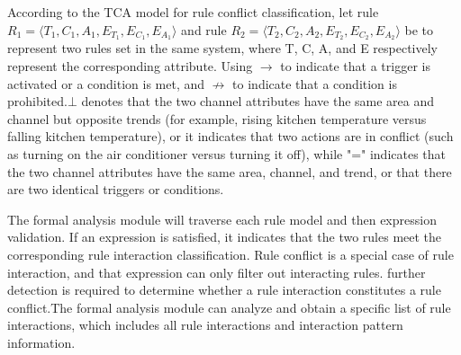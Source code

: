 According to the TCA model for rule conflict classification, let rule $R_1=\langle T_1,C_1,A_1,E_{T_1},E_{C_1},E_{A_1} \rangle$ and rule  $R_2=\langle T_2,C_2,A_2,E_{T_2},E_{C_2},E_{A_2} \rangle$ be to represent two rules set in the same system, where T, C, A, and E respectively represent the corresponding attribute. Using $\rightarrow$ to indicate that a trigger is activated or a condition is met, and $\nrightarrow$ to indicate that a condition is prohibited.$\bot$ denotes that the two channel attributes have the same area and channel but opposite trends (for example, rising kitchen temperature versus falling kitchen temperature), or it indicates that two actions are in conflict (such as turning on the air conditioner versus turning it off), while "=" indicates that the two channel attributes have the same area, channel, and trend, or that there are two identical triggers or conditions.

The formal analysis module will traverse each rule model and then expression validation. If an expression is satisfied, it indicates that the two rules meet the corresponding rule interaction classification. Rule conflict is a special case of rule interaction, and that expression can only filter out interacting rules. further detection is required to determine whether a rule interaction constitutes a rule conflict.The formal analysis module can analyze and obtain a specific list of rule interactions, which includes all rule interactions and interaction pattern information.

